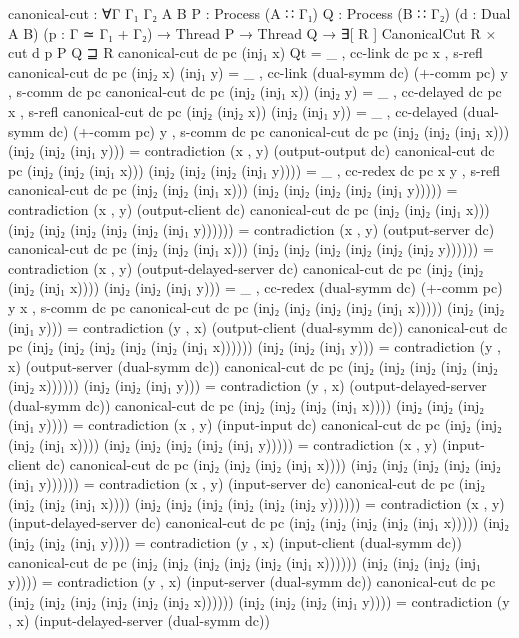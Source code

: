 \begin{code}
canonical-cut :
  ∀{Γ Γ₁ Γ₂ A B}
  {P : Process (A ∷ Γ₁)} {Q : Process (B ∷ Γ₂)}
  (d : Dual A B) (p : Γ ≃ Γ₁ + Γ₂) →
  Thread P → Thread Q →
  ∃[ R ] CanonicalCut R × cut d p P Q ⊒ R
canonical-cut dc pc (inj₁ x) Qt = _ , cc-link dc pc x , s-refl
canonical-cut dc pc (inj₂ x) (inj₁ y) = _ , cc-link (dual-symm dc) (+-comm pc) y , s-comm dc pc
canonical-cut dc pc (inj₂ (inj₁ x)) (inj₂ y) = _ , cc-delayed dc pc x , s-refl
canonical-cut dc pc (inj₂ (inj₂ x)) (inj₂ (inj₁ y)) = _ , cc-delayed (dual-symm dc) (+-comm pc) y , s-comm dc pc
canonical-cut dc pc (inj₂ (inj₂ (inj₁ x))) (inj₂ (inj₂ (inj₁ y))) = contradiction (x , y) (output-output dc)
canonical-cut dc pc (inj₂ (inj₂ (inj₁ x))) (inj₂ (inj₂ (inj₂ (inj₁ y)))) = _ , cc-redex dc pc x y , s-refl
canonical-cut dc pc (inj₂ (inj₂ (inj₁ x))) (inj₂ (inj₂ (inj₂ (inj₂ (inj₁ y))))) = contradiction (x , y) (output-client dc)
canonical-cut dc pc (inj₂ (inj₂ (inj₁ x))) (inj₂ (inj₂ (inj₂ (inj₂ (inj₂ (inj₁ y)))))) = contradiction (x , y) (output-server dc)
canonical-cut dc pc (inj₂ (inj₂ (inj₁ x))) (inj₂ (inj₂ (inj₂ (inj₂ (inj₂ (inj₂ y)))))) = contradiction (x , y) (output-delayed-server dc)
canonical-cut dc pc (inj₂ (inj₂ (inj₂ (inj₁ x)))) (inj₂ (inj₂ (inj₁ y))) = _ , cc-redex (dual-symm dc) (+-comm pc) y x , s-comm dc pc
canonical-cut dc pc (inj₂ (inj₂ (inj₂ (inj₂ (inj₁ x))))) (inj₂ (inj₂ (inj₁ y))) = contradiction (y , x) (output-client (dual-symm dc))
canonical-cut dc pc (inj₂ (inj₂ (inj₂ (inj₂ (inj₂ (inj₁ x)))))) (inj₂ (inj₂ (inj₁ y))) = contradiction (y , x) (output-server (dual-symm dc))
canonical-cut dc pc (inj₂ (inj₂ (inj₂ (inj₂ (inj₂ (inj₂ x)))))) (inj₂ (inj₂ (inj₁ y))) = contradiction (y , x) (output-delayed-server (dual-symm dc))
canonical-cut dc pc (inj₂ (inj₂ (inj₂ (inj₁ x)))) (inj₂ (inj₂ (inj₂ (inj₁ y)))) = contradiction (x , y) (input-input dc)
canonical-cut dc pc (inj₂ (inj₂ (inj₂ (inj₁ x)))) (inj₂ (inj₂ (inj₂ (inj₂ (inj₁ y))))) = contradiction (x , y) (input-client dc)
canonical-cut dc pc (inj₂ (inj₂ (inj₂ (inj₁ x)))) (inj₂ (inj₂ (inj₂ (inj₂ (inj₂ (inj₁ y)))))) = contradiction (x , y) (input-server dc)
canonical-cut dc pc (inj₂ (inj₂ (inj₂ (inj₁ x)))) (inj₂ (inj₂ (inj₂ (inj₂ (inj₂ (inj₂ y)))))) = contradiction (x , y) (input-delayed-server dc)
canonical-cut dc pc (inj₂ (inj₂ (inj₂ (inj₂ (inj₁ x))))) (inj₂ (inj₂ (inj₂ (inj₁ y)))) = contradiction (y , x) (input-client (dual-symm dc))
canonical-cut dc pc (inj₂ (inj₂ (inj₂ (inj₂ (inj₂ (inj₁ x)))))) (inj₂ (inj₂ (inj₂ (inj₁ y)))) = contradiction (y , x) (input-server (dual-symm dc))
canonical-cut dc pc (inj₂ (inj₂ (inj₂ (inj₂ (inj₂ (inj₂ x)))))) (inj₂ (inj₂ (inj₂ (inj₁ y)))) = contradiction (y , x) (input-delayed-server (dual-symm dc))

\end{code}
